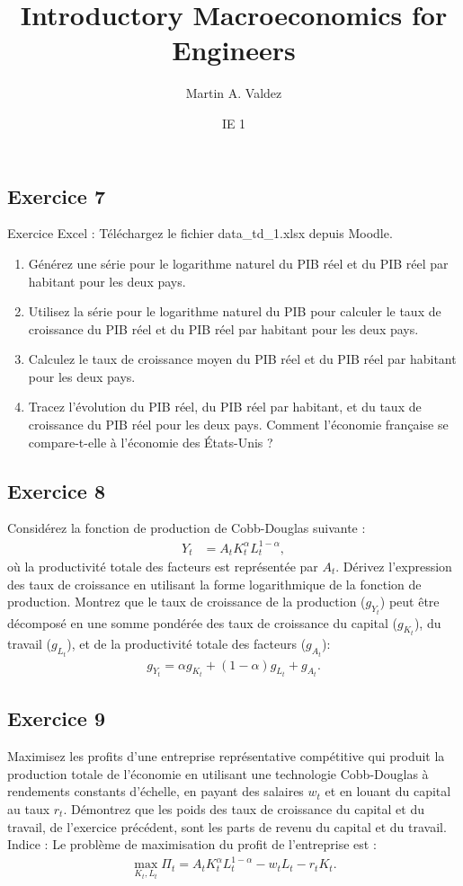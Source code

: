 \documentclass[11pt]{article}
\title{Introductory Macroeconomics for Engineers}
\author{Martin A. Valdez}
\date{IE 1}
\begin{document}
\maketitle
\subsection*{Exercice 7}
Exercice Excel : Téléchargez le fichier data\_td\_1.xlsx depuis Moodle.
\begin{enumerate}
    \item Générez une série pour le logarithme naturel du PIB réel et du PIB réel par habitant pour les deux pays.
    \item Utilisez la série pour le logarithme naturel du PIB pour calculer le taux de croissance du PIB réel et
            du PIB réel par habitant pour les deux pays.
    \item Calculez le taux de croissance moyen du PIB réel et du PIB réel par habitant pour les deux pays.
    \item Tracez l'évolution du PIB réel, du PIB réel par habitant, et du taux de croissance du PIB réel pour les deux pays.
    Comment l'économie française se compare-t-elle à l'économie des États-Unis ?
\end{enumerate}
\subsection*{Exercice 8}
Considérez la fonction de production de Cobb-Douglas suivante :
\begin{align*}
    Y_t &= A_t K_t^\alpha L_t^{1-\alpha},
\end{align*}
où la productivité totale des facteurs est représentée par \( A_t \). 
Dérivez l'expression des taux de croissance en utilisant la forme logarithmique de la fonction de production. Montrez que le taux de croissance de la production (\( g_{Y_t} \)) peut être décomposé en une somme pondérée des taux de croissance du capital (\( g_{K_t} \)), du travail (\( g_{L_t} \)), et de la productivité totale des facteurs (\( g_{A_t} \)):
\begin{align*}
    g_{Y_t} = \alpha g_{K_t} + (1-\alpha) g_{L_t} + g_{A_t}.    
\end{align*}

\subsection*{Exercice 9}
Maximisez les profits d'une entreprise représentative compétitive qui
produit la production totale de l'économie en utilisant une technologie Cobb-Douglas à rendements constants d'échelle, en payant des salaires \( w_t \) et en louant du capital au taux \( r_t \).
Démontrez que les poids des taux de croissance du capital et du travail,
de l'exercice précédent,
sont les parts de revenu du capital et du travail.
Indice : Le problème de maximisation du profit de l'entreprise est :
\begin{align*}
    \max_{K_t, L_t} \Pi_t = A_t K_t^\alpha L_t^{1-\alpha} - w_t L_t - r_t K_t.
\end{align*}
\end{document}
